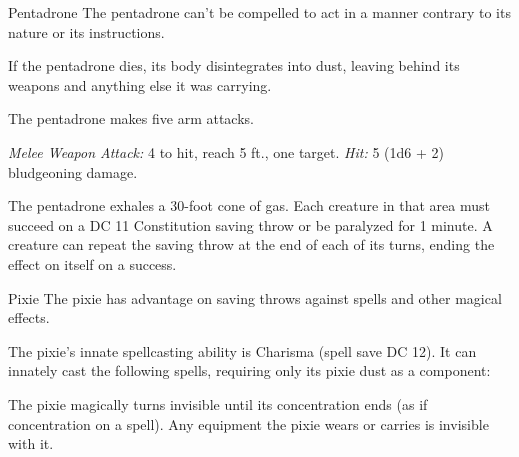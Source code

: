 \documentclass[10pt,a4paper,twoside,bg=print,twocolumn,openany,nodeprecatedcode]{dndbook}
\begin{document}
\begin{DndMonster}[float=t]{Pentadrone}
\DndMonsterBasics[
armor-class = {16 (natural armor)},
hit-points = {\DndDice{5d10 + 5}},
speed = {40 ft.}
]
\DndMonsterAbilityScores[
 str = 15,
 dex = 14,
 con = 12,
 int = 10,
 wis = 10,
 cha = 13
]
\DndMonsterDetails[
skills = {Perception +4},
senses = {truesight 120 ft., passive perception 14},
languages = {Modron},
challenge = 2,
]
The pentadrone can't be compelled to act in a manner contrary to its nature or its instructions.

If the pentadrone dies, its body disintegrates into dust, leaving behind its weapons and anything else it was carrying.

The pentadrone makes five arm attacks.

\textsl{Melee Weapon Attack:} 4 to hit, reach 5 ft., one target. \textsl{Hit:} 5 (1d6 + 2) bludgeoning damage.

The pentadrone exhales a 30-foot cone of gas. Each creature in that area must succeed on a DC 11 Constitution saving throw or be paralyzed for 1 minute. A creature can repeat the saving throw at the end of each of its turns, ending the effect on itself on a success.

\end{DndMonster}



\begin{DndMonster}[float=t]{Pixie}
\DndMonsterBasics[
armor-class = {15},
hit-points = {\DndDice{1d4 - 1}},
speed = {10 ft., fly 30 ft.}
]
\DndMonsterAbilityScores[
 str = 2,
 dex = 20,
 con = 8,
 int = 10,
 wis = 14,
 cha = 15
]
\DndMonsterDetails[
skills = {Perception +4, Stealth +7},
languages = {Sylvan},
challenge = 1/4,
]
The pixie has advantage on saving throws against spells and other magical effects.

The pixie's innate spellcasting ability is Charisma (spell save DC 12). It can innately cast the following spells, requiring only its pixie dust as a component:
\begin{DndMonsterSpells}
\end{DndMonsterSpells}
The pixie magically turns invisible until its concentration ends (as if concentration on a spell). Any equipment the pixie wears or carries is invisible with it.

\end{DndMonster}
\end{document}
